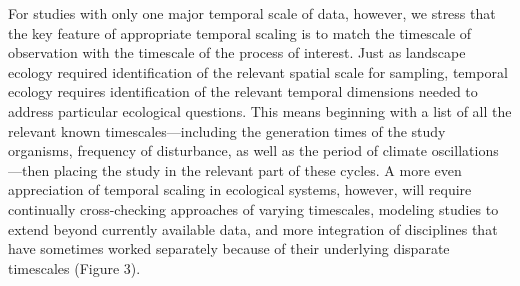 \documentclass[11pt,a4paper,oneside]{article}
\begin{document}
For studies with only one major temporal scale of data, however, we stress that the key feature of appropriate temporal scaling is to match the timescale of observation with the timescale of the process of interest. Just as landscape ecology required identification of the relevant spatial scale for sampling, temporal ecology requires identification of the relevant temporal dimensions needed to address particular ecological questions. This means beginning with a list of all the relevant known timescales---including the generation times of the study organisms, frequency of disturbance, as well as the period of climate oscillations---then placing the study in the relevant part of these cycles. A more even appreciation of temporal scaling in ecological systems, however, will require continually cross-checking approaches of varying timescales, modeling studies to extend beyond currently available data, and more integration of disciplines that have sometimes worked separately because of their underlying disparate timescales (Figure 3). \\
\end{document}
